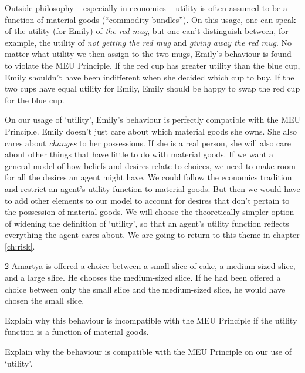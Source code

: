Outside philosophy -- especially in economics -- utility is often assumed to be
a function of material goods (``commodity bundles''). On this usage, one can
speak of the utility (for Emily) of \emph{the red mug}, but one can't
distinguish between, for example, the utility of \emph{not getting the red mug}
and \emph{giving away the red mug}. No matter what utility we then assign to the
two mugs, Emily's behaviour is found to violate the MEU Principle. If the red
cup has greater utility than the blue cup, Emily shouldn't have been
indifferent when she decided which cup to buy. If the two cups have equal
utility for Emily, Emily should be happy to swap the red cup for the blue
cup.

On our usage of `utility', Emily's behaviour is perfectly compatible with the
MEU Principle. Emily doesn't just care about which material goods she
owns. She also cares about \emph{changes} to her possessions. If she is a real
person, she will also care about other things that have little to do with
material goods. If we want a general model of how beliefs and desires relate to
choices, we need to make room for all the desires an agent might have. We could
follow the economics tradition and restrict an agent's utility function to
material goods. But then we would have to add other elements to our model to
account for desires that don't pertain to the possession of material goods. We
will choose the theoretically simpler option of widening the definition of
`utility', so that an agent's utility function reflects everything the agent
cares about. We are going to return to this theme in chapter \ref{ch:risk}.


\begin{exercise}{2}
  Amartya is offered a choice between a small slice of cake, a medium-sized
  slice, and a large slice. He chooses the medium-sized slice. If he had been
  offered a choice between only the small slice and the medium-sized slice, he
  would have chosen the small slice.
  \begin{exlist}
    \item Explain why this behaviour is incompatible with the MEU Principle if
    the utility function is a function of material goods.
    \item Explain why the behaviour is compatible with the MEU Principle on our
    use of `utility'.
  \end{exlist}
\end{exercise}

